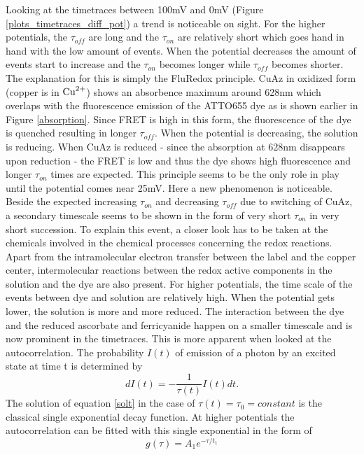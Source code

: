 \documentclass[twoside,single]{lion-msc}
\begin{document}
Looking at the timetraces between 100mV and 0mV (Figure \ref{plots_timetraces_diff_pot}) a trend is noticeable on sight. For the higher potentials, the $\tau_{off}$ are long and the $\tau_{on}$ are relatively short which goes hand in hand with the low amount of events. When the potential decreases the amount of events start to increase and the $\tau_{on}$ becomes longer while $\tau_{off}$ becomes shorter. The explanation for this is simply the FluRedox principle. CuAz in oxidized form (copper is in $\textup{Cu}^{2+}$) shows an absorbence maximum around 628nm which overlaps with the fluorescence emission of the ATTO655 dye as is shown earlier in Figure \ref{absorption}. Since FRET is high in this form, the fluorescence of the dye is quenched resulting in longer $\tau_{off}$. When the potential is decreasing, the solution is reducing. When CuAz is reduced - since the absorption at 628nm disappears upon reduction - the FRET is low and thus the dye  shows high fluorescence and longer $\tau_{on}$ times are expected. This principle seems to be the only role in play until the potential comes near 25mV. Here a new phenomenon is noticeable. Beside the expected  increasing $\tau_{on}$ and decreasing $\tau_{off}$ due to switching of CuAz, a secondary timescale seems to be shown in the form of very short $\tau_{on}$ in very short succession. To explain this event, a closer look has to be taken at the chemicals involved in the chemical processes concerning the redox reactions. Apart from the intramolecular electron transfer between the label and the copper center, intermolecular reactions between the redox active components in the solution and the dye are also present. For higher potentials, the time scale of the events between dye and solution are relatively high. When the potential gets lower, the solution is more and more reduced. The interaction between the dye and the reduced ascorbate and ferricyanide happen on a smaller timescale and is now prominent in the timetraces. This is more apparent when looked at the autocorrelation. The probability $I(t)$ of emission of a photon by an excited state at time t is determined by
\begin{equation} \label{solt}
dI(t) = -\frac{1}{\tau(t)}I(t)dt.
\end{equation}
The solution of equation \ref{solt} in the case of $\tau(t) = \tau_{0}= constant$ is the classical single exponential decay function. At higher potentials the autocorrelation can be fitted with this single exponential in the form of
\begin{equation} \label{single_exp}
g(\tau) =  A_{1}e^{-\tau/t_{1}}
\end{equation}
\end{document}
